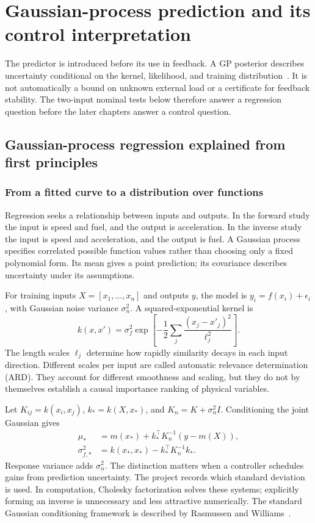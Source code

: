 \chapter{Gaussian-process prediction and its control interpretation}
\label{ch:gp}
The predictor is introduced before its use in feedback. A GP posterior describes uncertainty conditional on the kernel, likelihood, and training distribution~\cite{gpml}. It is not automatically a bound on unknown external load or a certificate for feedback stability. The two-input nominal tests below therefore answer a regression question before the later chapters answer a control question.

\section{Gaussian-process regression explained from first principles}
\subsection{From a fitted curve to a distribution over functions}
Regression seeks a relationship between inputs and outputs. In the forward study the input is speed and fuel, and the output is acceleration. In the inverse study the input is speed and acceleration, and the output is fuel. A Gaussian process specifies correlated possible function values rather than choosing only a fixed polynomial form. Its mean gives a point prediction; its covariance describes uncertainty under its assumptions.

For training inputs $X=[x_1,\ldots,x_n]$ and outputs $y$, the model is $y_i=f(x_i)+\epsilon_i$, with Gaussian noise variance $\sigma_n^2$. A squared-exponential kernel is
\begin{equation}k(x,x')=\sigma_f^2\exp\left[-\frac12\sum_j\frac{(x_j-x'_j)^2}{\ell_j^2}\right].
\end{equation}
The length scales $\ell_j$ determine how rapidly similarity decays in each input direction. Different scales per input are called automatic relevance determination (ARD). They account for different smoothness and scaling, but they do not by themselves establish a causal importance ranking of physical variables.

Let $K_{ij}=k(x_i,x_j)$, $k_*=k(X,x_*)$, and $K_n=K+\sigma_n^2I$. Conditioning the joint Gaussian gives
\begin{align}\mu_*&=m(x_*)+k_*^\top K_n^{-1}(y-m(X)),\\
\sigma_{f,*}^2&=k(x_*,x_*)-k_*^\top K_n^{-1}k_*.
\end{align}
Response variance adds $\sigma_n^2$. The distinction matters when a controller schedules gains from prediction uncertainty. The project records which standard deviation is used. In computation, Cholesky factorization solves these systems; explicitly forming an inverse is unnecessary and less attractive numerically. The standard Gaussian conditioning framework is described by Rasmussen and Williams~\cite{gpml}.

